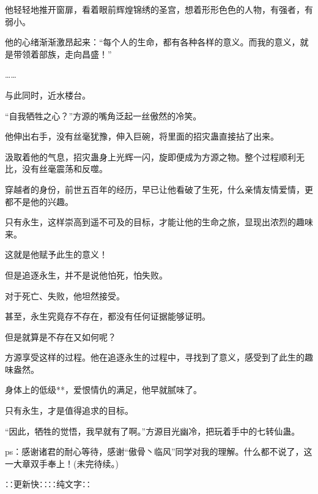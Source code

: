 \begin{this_body}
他轻轻地推开窗扉，看着眼前辉煌锦绣的圣宫，想着形形色色的人物，有强者，有弱小。

他的心绪渐渐激昂起来：“每个人的生命，都有各种各样的意义。而我的意义，就是带领着部族，走向昌盛！”

……

与此同时，近水楼台。

“自我牺牲之心？”方源的嘴角泛起一丝傲然的冷笑。

他伸出右手，没有丝毫犹豫，伸入巨碗，将里面的招灾蛊直接拈了出来。

汲取着他的气息，招灾蛊身上光辉一闪，旋即便成为方源之物。整个过程顺利无比，没有丝毫震荡和反噬。

穿越者的身份，前世五百年的经历，早已让他看破了生死，什么亲情友情爱情，更都不是他的兴趣。

只有永生，这样崇高到遥不可及的目标，才能让他的生命之旅，显现出浓烈的趣味来。

这就是他赋予此生的意义！

但是追逐永生，并不是说他怕死，怕失败。

对于死亡、失败，他坦然接受。

甚至，永生究竟存不存在，都没有任何证据能够证明。

但是就算是不存在又如何呢？

方源享受这样的过程。他在追逐永生的过程中，寻找到了意义，感受到了此生的趣味盎然。

身体上的低级**，爱恨情仇的满足，他早就腻味了。

只有永生，才是值得追求的目标。

“因此，牺牲的觉悟，我早就有了啊。”方源目光幽冷，把玩着手中的七转仙蛊。

ps：感谢诸君的耐心等待，感谢“傲骨丶临风”同学对我的理解。什么都不说了，这一大章双手奉上！(未完待续。)

∷更新快∷∷纯文字∷

\end{this_body}

